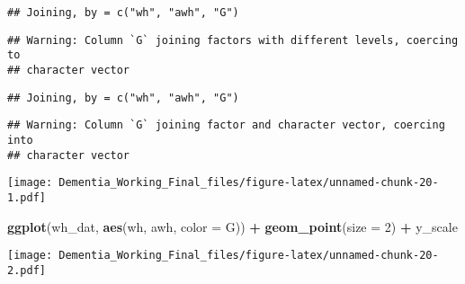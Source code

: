 \documentclass[]{article}
\newenvironment{Shaded}{\begin{snugshade}}{\end{snugshade}}
\newcommand{\DataTypeTok}[1]{\textcolor[rgb]{0.13,0.29,0.53}{#1}}
\newcommand{\DecValTok}[1]{\textcolor[rgb]{0.00,0.00,0.81}{#1}}
\newcommand{\KeywordTok}[1]{\textcolor[rgb]{0.13,0.29,0.53}{\textbf{#1}}}
\newcommand{\NormalTok}[1]{#1}
\newcommand{\OperatorTok}[1]{\textcolor[rgb]{0.81,0.36,0.00}{\textbf{#1}}}
\newcommand{\StringTok}[1]{\textcolor[rgb]{0.31,0.60,0.02}{#1}}
\begin{document}
\begin{verbatim}
## Joining, by = c("wh", "awh", "G")
\end{verbatim}

\begin{verbatim}
## Warning: Column `G` joining factors with different levels, coercing to
## character vector
\end{verbatim}

\begin{verbatim}
## Joining, by = c("wh", "awh", "G")
\end{verbatim}

\begin{verbatim}
## Warning: Column `G` joining factor and character vector, coercing into
## character vector
\end{verbatim}

\begin{Shaded}
\end{Shaded}

\texttt{[image: Dementia\_Working\_Final\_files/figure-latex/unnamed-chunk-20-1.pdf]}

\begin{Shaded}
\begin{Highlighting}[]
\KeywordTok{ggplot}\NormalTok{(wh_dat, }\KeywordTok{aes}\NormalTok{(wh, awh, }\DataTypeTok{color =}\NormalTok{ G)) }\OperatorTok{+}\StringTok{ }\KeywordTok{geom_point}\NormalTok{(}\DataTypeTok{size =} \DecValTok{2}\NormalTok{) }\OperatorTok{+}\StringTok{ }\NormalTok{y_scale}
\end{Highlighting}
\end{Shaded}

\texttt{[image: Dementia\_Working\_Final\_files/figure-latex/unnamed-chunk-20-2.pdf]}

\begin{Shaded}
\end{Shaded}
\end{document}
